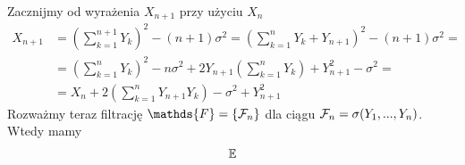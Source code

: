 \begin{solution}
  Zacznijmy od wyrażenia $X_{n+1}$ przy użyciu $X_n$
  \begin{align*}
    X_{n+1}&=\left( \sum_{k=1}^{n+1}Y_{k} \right)^2 - (n+1)\sigma^2= \left( \sum_{k=1}^nY_k +Y_{n+1} \right)^2 - (n+1)\sigma^2=\\ 
           &=\left(\sum_{k=1}^n Y_k \right)^2 -n\sigma ^2 + 2 Y_{n+1}\left( \sum_{k=1}^n Y_k \right) +Y_{n+1}^2 -\sigma^2=\\ 
           &=X_n+2\left( \sum_{k=1}^nY_{n+1}Y_k \right) -\sigma^2 + Y_{n+1}^2
  \end{align*}
  Rozważmy teraz filtrację $\mathds{F}=\{\set{F}_n\}$ dla ciągu $\mathcal{F}_n=\sigma(Y_1,...,Y_n)$. Wtedy mamy
  \begin{align*}
    \expected
  \end{align*}
\end{solution}
